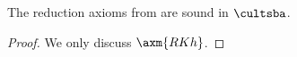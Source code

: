 \medskip 

\begin{lemma}\label{lemma:arrow-kh-valid}
	The reduction axioms from  are sound in $\cultsba$.
\end{lemma}

\begin{proof} We only discuss $\axm{RKh}$.  

\end{proof}
